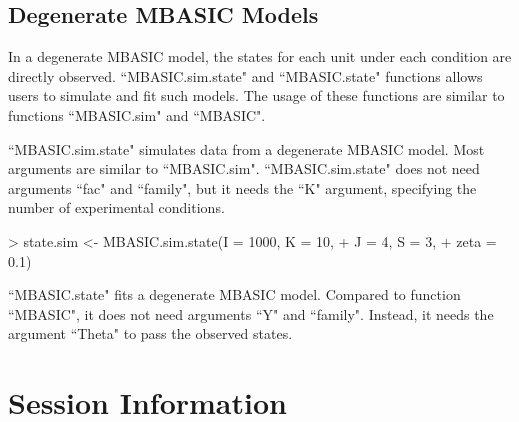 \documentclass[a4paper,10pt]{article}
\begin{document}
\subsection{Degenerate MBASIC Models}

In a degenerate MBASIC model, the states for each unit under each condition are directly observed. ``MBASIC.sim.state" and ``MBASIC.state" functions allows users to simulate and fit such models. The usage of these functions are similar to functions ``MBASIC.sim" and ``MBASIC".

``MBASIC.sim.state" simulates data from a degenerate MBASIC model. Most arguments are similar to ``MBASIC.sim". ``MBASIC.sim.state" does not need arguments ``fac" and ``family", but it needs the ``K" argument, specifying the number of experimental conditions.

\begin{Schunk}
\begin{Sinput}
> state.sim <- MBASIC.sim.state(I = 1000, K = 10,
+                               J = 4, S = 3,
+                               zeta = 0.1)
\end{Sinput}
\end{Schunk}

``MBASIC.state" fits a degenerate MBASIC model. Compared to function ``MBASIC", it does not need arguments ``Y" and ``family". Instead, it needs the argument ``Theta" to pass the observed states.

\begin{Schunk}
\end{Schunk}

\section{Session Information}
\end{document}
